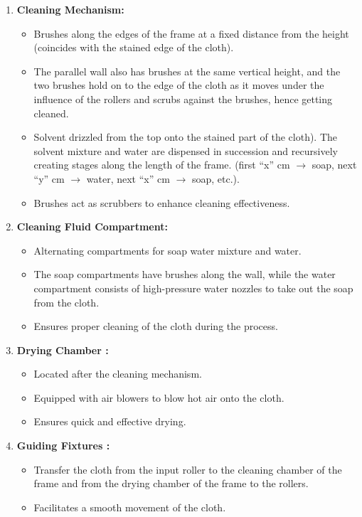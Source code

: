 \documentclass[table,french,english]{rapportCS}
\begin{document}
\begin{enumerate}[label=\arabic*.]
    \item \textbf{Cleaning Mechanism:}
    \begin{itemize}[label=$\bullet$]
        \item Brushes along the edges of the frame at a fixed distance from the height (coincides with the stained edge of the cloth).
        \item The parallel wall also has brushes at the same vertical height, and the two brushes hold on to the edge of the cloth as it moves under the influence of the rollers and scrubs against the brushes, hence getting cleaned.
        \item Solvent drizzled from the top onto the stained part of the cloth). The solvent mixture and water are dispensed in succession and recursively creating stages along the length of the frame. (first “x” cm  $\rightarrow$  soap, next “y” cm $\rightarrow$ water, next “x” cm $\rightarrow$  soap, etc.).
        \item Brushes act as scrubbers to enhance cleaning effectiveness.
    \end{itemize}

    \item \textbf{Cleaning Fluid Compartment:}
    \begin{itemize}[label=$\bullet$]
        \item Alternating compartments for soap water mixture and water.
        \item The soap compartments have brushes along the wall, while the water compartment consists of high-pressure water nozzles to take out the soap from the cloth.
        \item Ensures proper cleaning of the cloth during the process.
    \end{itemize}

    \item \textbf{Drying Chamber :}
    \begin{itemize}[label=$\bullet$]
        \item Located after the cleaning mechanism.
        \item Equipped with \gls{air blowers}  to blow hot air onto the cloth.
        \item Ensures quick and effective drying.
    \end{itemize}

    \item \textbf{Guiding \gls{Fixtures} : }
    \begin{itemize}[label=$\bullet$]
        \item Transfer the cloth from the input roller to the cleaning chamber of the frame and from the drying chamber of the frame to the rollers.
        \item Facilitates a smooth movement of the cloth.
    \end{itemize}


\end{enumerate}
\end{document}
